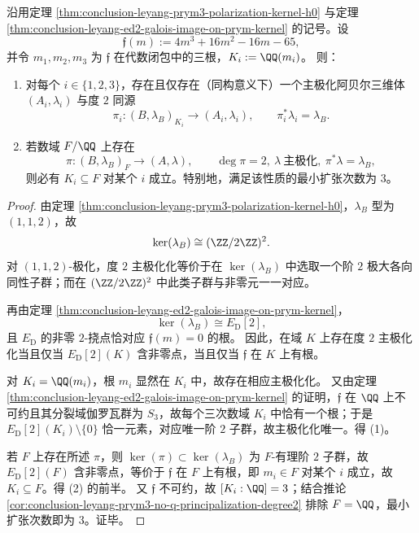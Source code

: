 \begin{theorem}\label{thm:conclusion-leyang-prym3-principalization-minimal-field}
沿用定理 \ref{thm:conclusion-leyang-prym3-polarization-kernel-h0} 与定理 \ref{thm:conclusion-leyang-ed2-galois-image-on-prym-kernel} 的记号。设
\[
\mathfrak f(m):=4m^3+16m^2-16m-65,
\]
并令 \(m_1,m_2,m_3\) 为 \(\mathfrak f\) 在代数闭包中的三根，\(K_i:=\QQ(m_i)\)。
则：
\begin{enumerate}
  \item 对每个 \(i\in\{1,2,3\}\)，存在且仅存在（同构意义下）一个主极化阿贝尔三维体 \((A_i,\lambda_i)\) 与度 \(2\) 同源
  \[
  \pi_i:(B,\lambda_B)_{K_i}\to (A_i,\lambda_i),
  \qquad
  \pi_i^*\lambda_i=\lambda_B.
  \]
  \item 若数域 \(F/\QQ\) 上存在
  \[
  \pi:(B,\lambda_B)_F\to (A,\lambda),
  \qquad
  \deg\pi=2,\ \lambda\ \text{主极化},\ \pi^*\lambda=\lambda_B,
  \]
  则必有 \(K_i\subseteq F\) 对某个 \(i\) 成立。特别地，满足该性质的最小扩张次数为 \(3\)。
\end{enumerate}
\end{theorem}
\begin{proof}
由定理 \ref{thm:conclusion-leyang-prym3-polarization-kernel-h0}，\(\lambda_B\) 型为 \((1,1,2)\)，故
\[
\ker(\lambda_B)\cong (\ZZ/2\ZZ)^2.
\]
对 \((1,1,2)\)-极化，度 \(2\) 主极化化等价于在 \(\ker(\lambda_B)\) 中选取一个阶 \(2\) 极大各向同性子群；而在 \((\ZZ/2\ZZ)^2\) 中此类子群与非零元一一对应。

再由定理 \ref{thm:conclusion-leyang-ed2-galois-image-on-prym-kernel}，
\[
\ker(\lambda_B)\cong E_{\mathrm D}[2],
\]
且 \(E_{\mathrm D}\) 的非零 \(2\)-挠点恰对应 \(\mathfrak f(m)=0\) 的根。
因此，在域 \(K\) 上存在度 \(2\) 主极化化当且仅当 \(E_{\mathrm D}[2](K)\) 含非零点，当且仅当 \(\mathfrak f\) 在 \(K\) 上有根。

对 \(K_i=\QQ(m_i)\)，根 \(m_i\) 显然在 \(K_i\) 中，故存在相应主极化化。
又由定理 \ref{thm:conclusion-leyang-ed2-galois-image-on-prym-kernel} 的证明，\(\mathfrak f\) 在 \(\QQ\) 上不可约且其分裂域伽罗瓦群为 \(S_3\)，故每个三次数域 \(K_i\) 中恰有一个根；于是 \(E_{\mathrm D}[2](K_i)\setminus\{0\}\) 恰一元素，对应唯一阶 \(2\) 子群，故主极化化唯一。得 (1)。

若 \(F\) 上存在所述 \(\pi\)，则 \(\ker(\pi)\subset\ker(\lambda_B)\) 为 \(F\)-有理阶 \(2\) 子群，故 \(E_{\mathrm D}[2](F)\) 含非零点，等价于 \(\mathfrak f\) 在 \(F\) 上有根，即 \(m_i\in F\) 对某个 \(i\) 成立，故 \(K_i\subseteq F\)。得 (2) 的前半。
又 \(\mathfrak f\) 不可约，故 \([K_i:\QQ]=3\)；结合推论 \ref{cor:conclusion-leyang-prym3-no-q-principalization-degree2} 排除 \(F=\QQ\)，最小扩张次数即为 \(3\)。证毕。
\end{proof}

